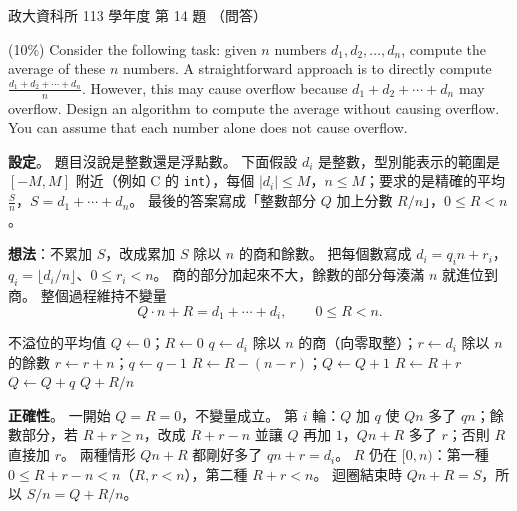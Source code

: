 \begin{pastexam}[label={px:nccu-113-dsa-14}]{政大資科所 113 學年度 第 14 題}
（問答）

(10\%) Consider the following task: given $n$ numbers $d_1,d_2,\ldots,d_n$, compute the average of these $n$
numbers. A straightforward approach is to directly compute $\frac{d_1+d_2+\cdots+d_n}{n}$. However, this may
cause overflow because $d_1+d_2+\cdots+d_n$ may overflow. Design an algorithm to compute the average without
causing overflow. You can assume that each number alone does not cause overflow.
\end{pastexam}

\begin{pastsoln}
\textbf{設定}。 題目沒說是整數還是浮點數。 下面假設 $d_i$ 是整數，型別能表示的範圍是 $[-M, M]$ 附近（例如
C 的 \texttt{int}），每個 $|d_i| \le M$，$n \le M$；要求的是精確的平均 $\frac{S}{n}$，$S = d_1 + \cdots + d_n$。
最後的答案寫成「整數部分 $Q$ 加上分數 $R/n$」，$0 \le R < n$。

\textbf{想法}：不累加 $S$，改成累加 $S$ 除以 $n$ 的商和餘數。 把每個數寫成
$d_i = q_i n + r_i$，$q_i = \lfloor d_i / n \rfloor$、$0 \le r_i < n$。 商的部分加起來不大，餘數的部分每湊滿 $n$
就進位到商。 整個過程維持不變量
\[
Q \cdot n + R = d_1 + \cdots + d_i, \qquad 0 \le R < n .
\]

\begin{pseudo}{不溢位的平均值}
    \State $Q \gets 0$；$R \gets 0$
        \State $q \gets d_i$ 除以 $n$ 的商（向零取整）；$r \gets d_i$ 除以 $n$ 的餘數 
         
            \State $r \gets r + n$；$q \gets q - 1$
        \EndIf
         
            \State $R \gets R - (n - r)$；$Q \gets Q + 1$
        \Else
            \State $R \gets R + r$
        \EndIf
        \State $Q \gets Q + q$
    \EndFor
    \State \Return $Q + R / n$ 
\EndFunction
\end{pseudo}

\textbf{正確性}。 一開始 $Q = R = 0$，不變量成立。 第 $i$ 輪：$Q$ 加 $q$ 使 $Q n$ 多了 $q n$；餘數部分，若
$R + r \ge n$，改成 $R + r - n$ 並讓 $Q$ 再加 $1$，$Qn + R$ 多了 $r$；否則 $R$ 直接加 $r$。 兩種情形 $Qn + R$
都剛好多了 $qn + r = d_i$。 $R$ 仍在 $[0, n)$：第一種 $0 \le R + r - n < n$（$R, r < n$），第二種 $R + r < n$。
迴圈結束時 $Qn + R = S$，所以 $S/n = Q + R/n$。


\end{pastsoln}
